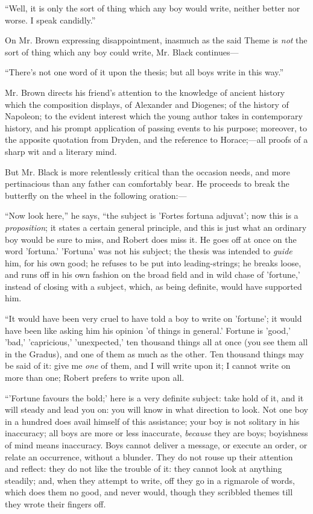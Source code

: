 ``Well, it is only the sort of thing which any boy would write,
neither better nor worse. I speak candidly.''

On Mr. Brown expressing disappointment, inasmuch as the said Theme
is \emph{not} the sort of thing which any boy could write, Mr. Black
continues—

``There's not one word of it upon the thesis; but all boys
write in this way.''

Mr. Brown directs his friend's attention to the knowledge of
ancient history which the composition displays, of Alexander and
Diogenes; of the history of Napoleon; to the evident interest which
the young author takes in contemporary history, and his prompt
application of passing events to his purpose; moreover, to the
apposite quotation from Dryden, and the reference to Horace;—all
proofs of a sharp wit and a literary mind.

But Mr. Black is more relentlessly critical than the occasion
needs, and more pertinacious than any father can comfortably bear. He
proceeds to break the butterfly on the wheel in the following oration:—

``Now look here,'' he says, ``the subject is 'Fortes
fortuna adjuvat'; now this is a \emph{proposition}; it states a
certain general principle, and this is just what an ordinary boy would
be sure to miss, and Robert does miss it. He goes off at once on the
word 'fortuna.' 'Fortuna' was not his subject; the thesis was intended
to \emph{guide} him, for his own good; he refuses to be put into
leading-strings; he breaks loose, and runs off in his own fashion on
the broad field and in wild chase of 'fortune,' instead of closing
with a subject, which, as being definite, would have supported him.

``It would have been very cruel to have told a boy to write on
'fortune'; it would have been like asking him his opinion 'of
things in general.' Fortune is 'good,' 'bad,' 'capricious,'
'unexpected,' ten thousand things all at once (you see them all in the
Gradus), and one of them as much as the other. Ten thousand things may
be said of it: give me \emph{one} of them, and I will write upon it; I
cannot write on more than one; Robert prefers to write upon all.

``'Fortune favours the bold;' here is a very definite subject:
take hold of it, and it will steady and lead you on: you will know in
what direction to look. Not one boy in a hundred does avail himself of
this assistance; your boy is not solitary in his inaccuracy; all boys
are more or less inaccurate, \emph{because} they are boys; boyishness
of mind means inaccuracy. Boys cannot deliver a message, or execute an
order, or relate an occurrence, without a blunder. They do not rouse
up their attention and reflect: they do not like the trouble of it:
they cannot look at anything steadily; and, when they attempt to
write, off they go in a rigmarole of words, which does them no good,
and never would, though they scribbled themes till they wrote their
fingers off.

